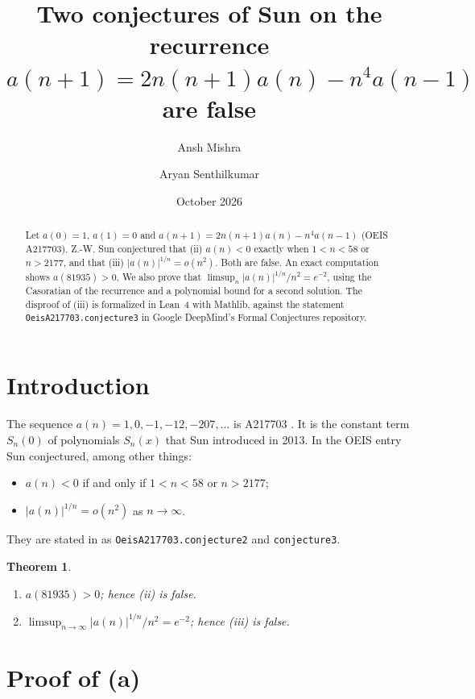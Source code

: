 \documentclass[11pt]{amsart}
\newtheorem{theorem}{Theorem}
\theoremstyle{remark}
\newcommand{\lean}[1]{\texttt{#1}}
\begin{document}
\title[Two conjectures of Sun on A217703]{Two conjectures of Sun on the recurrence $a(n+1)=2n(n+1)a(n)-n^4a(n-1)$ are false}

\author{Ansh Mishra}
\author{Aryan Senthilkumar}

\date{October 2026}

\begin{abstract}
Let $a(0)=1$, $a(1)=0$ and $a(n+1)=2n(n+1)a(n)-n^4a(n-1)$ (OEIS A217703).
Z.-W. Sun conjectured that (ii) $a(n)<0$ exactly when $1<n<58$ or $n>2177$, and that (iii) $|a(n)|^{1/n}=o(n^2)$.
Both are false.
An exact computation shows $a(81935)>0$.
We also prove that $\limsup_n|a(n)|^{1/n}/n^2=e^{-2}$, using the Casoratian of the recurrence and a polynomial bound for a second solution.
The disproof of (iii) is formalized in Lean~4 with Mathlib, against the statement \lean{OeisA217703.conjecture3} in Google DeepMind's Formal Conjectures repository.
\end{abstract}

\maketitle

\section{Introduction}

The sequence $a(n)=1,0,-1,-12,-207,\dots$ is A217703 \cite{OEIS}.
It is the constant term $S_n(0)$ of polynomials $S_n(x)$ that Sun introduced in 2013.
In the OEIS entry Sun conjectured, among other things:
\begin{itemize}
\item[(ii)] $a(n)<0$ if and only if $1<n<58$ or $n>2177$;
\item[(iii)] $|a(n)|^{1/n}=o(n^2)$ as $n\to\infty$.
\end{itemize}
They are stated in \cite{FC} as \lean{OeisA217703.conjecture2} and \lean{conjecture3}.

\begin{theorem}\label{thm}
\begin{enumerate}
\item[(a)] $a(81935)>0$; hence (ii) is false.
\item[(b)] $\limsup_{n\to\infty}|a(n)|^{1/n}/n^2=e^{-2}$; hence (iii) is false.
\end{enumerate}
\end{theorem}

\section{Proof of (a)}
\end{document}
